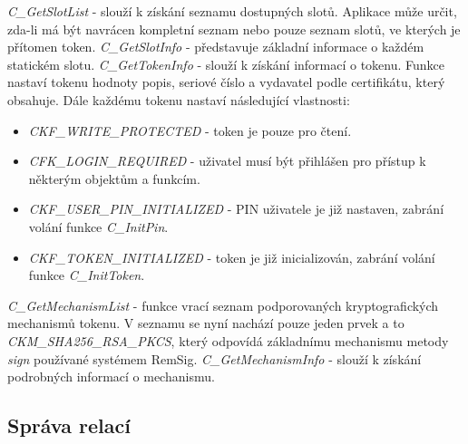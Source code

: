 \documentclass[]{fithesis3}
\begin{document}
	\textit{C\_GetSlotList} - slouží k získání seznamu dostupných slotů. Aplikace může 				určit, zda-li má být navrácen kompletní seznam nebo pouze seznam slotů, ve kterých je 			přítomen token.
	\newline
	\newline
	\textit{C\_GetSlotInfo} - představuje základní informace o každém statickém slotu.
	\newline
	\newline
	\textit{C\_GetTokenInfo} - slouží k získání informací o tokenu. Funkce nastaví tokenu 				hodnoty popis, seriové číslo a vydavatel podle certifikátu, který obsahuje. Dále každému 			tokenu nastaví následující vlastnosti:
		\begin{itemize}
		\item \textit{CKF\_WRITE\_PROTECTED} - token je pouze pro čtení.

		\item \textit{CFK\_LOGIN\_REQUIRED} - uživatel musí být přihlášen pro přístup k 				některým objektům a funkcím.

		\item \textit{CKF\_USER\_PIN\_INITIALIZED} - PIN uživatele je již nastaven, zabrání 				volání funkce \textit{C\_InitPin}.

		\item \textit{CKF\_TOKEN\_INITIALIZED} - token je již inicializován, zabrání volání funkce 			\textit{C\_InitToken}.
		\end{itemize}
	\textit{C\_GetMechanismList} - funkce vrací seznam podporovaných kryptografických 				mechanismů tokenu. V seznamu se nyní nachází pouze jeden prvek a to 							\textit{CKM\_SHA256\_RSA\_PKCS}, který odpovídá základnímu mechanismu metody 			\textit{sign} používané systémem RemSig.
	\newline
	\newline
	\textit{C\_GetMechanismInfo} - slouží k získání podrobných informací o mechanismu.

	\subsection{Správa relací} 
\end{document}
